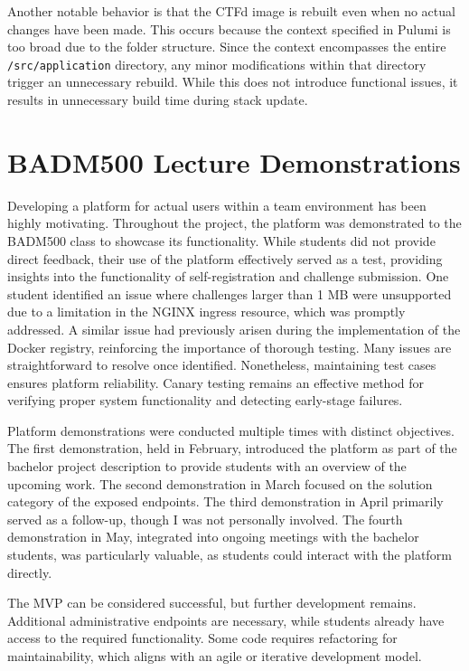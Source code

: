 Another notable behavior is that the CTFd image is rebuilt even when no actual changes have been made. This occurs because the context specified in Pulumi is too broad due to the folder structure. Since the context encompasses the entire \texttt{/src/application} directory, any minor modifications within that directory trigger an unnecessary rebuild. While this does not introduce functional issues, it results in unnecessary build time during stack update.

\section{BADM500 Lecture Demonstrations}
Developing a platform for actual users within a team environment has been highly motivating. Throughout the project, the platform was demonstrated to the BADM500 class to showcase its functionality. While students did not provide direct feedback, their use of the platform effectively served as a test, providing insights into the functionality of self-registration and challenge submission. One student identified an issue where challenges larger than 1 MB were unsupported due to a limitation in the NGINX ingress resource, which was promptly addressed. A similar issue had previously arisen during the implementation of the Docker registry, reinforcing the importance of thorough testing. Many issues are straightforward to resolve once identified. Nonetheless, maintaining test cases ensures platform reliability. Canary testing remains an effective method for verifying proper system functionality and detecting early-stage failures.

Platform demonstrations were conducted multiple times with distinct objectives. The first demonstration, held in February, introduced the platform as part of the bachelor project description to provide students with an overview of the upcoming work. The second demonstration in March focused on the solution category of the exposed endpoints. The third demonstration in April primarily served as a follow-up, though I was not personally involved. The fourth demonstration in May, integrated into ongoing meetings with the bachelor students, was particularly valuable, as students could interact with the platform directly.

The MVP can be considered successful, but further development remains. Additional administrative endpoints are necessary, while students already have access to the required functionality. Some code requires refactoring for maintainability, which aligns with an agile or iterative development model.

